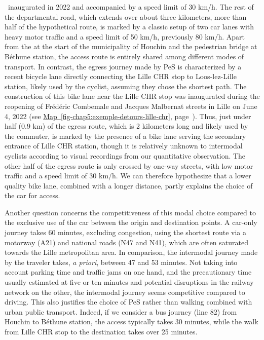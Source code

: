 \begin{refsegment}
{}~inaugurated in 2022 and accompanied by a speed limit of 30 km/h. The rest of the departmental road, which extends over about three kilometers, more than half of the hypothetical route, is marked by a classic setup of two car lanes with heavy motor traffic and a speed limit of 50 km/h, previously 80 km/h. Apart from the  at the start of the municipality of Houchin and the pedestrian bridge at Béthune station, the access route is entirely shared among different modes of transport. In contrast, the egress journey made by \acrshort{PeS} is characterized by a recent bicycle lane directly connecting the Lille CHR stop to Loos-lez-Lille station, likely used by the cyclist, assuming they chose the shortest path. The construction of this bike lane near the Lille CHR stop was inaugurated during the reopening of Frédéric Combemale and Jacques Malbernat streets in Lille on June 4, 2022 (see \hyperref[fig-chap5:exemple-detours-lille-chr]{Map~\ref{fig-chap5:exemple-detours-lille-chr}}, page~\pageref{fig-chap5:exemple-detours-lille-chr}). Thus, just under half (0.9 km) of the egress route, which is 2 kilometers long and likely used by the commuter, is marked by the presence of a bike lane serving the secondary entrance of Lille CHR station, though it is relatively unknown to intermodal cyclists according to visual recordings from our quantitative observation. The other half of the egress route is only crossed by one-way streets, with low motor traffic and a speed limit of 30 km/h. We can therefore hypothesize that a lower quality bike lane, combined with a longer distance, partly explains the choice of the car for access.%

Another question concerns the competitiveness of this modal choice compared to the exclusive use of the car between the origin and destination points. A car-only journey takes 60 minutes, excluding congestion, using the shortest route via a motorway (A21) and national roads (N47 and N41), which are often saturated towards the Lille metropolitan area. In comparison, the intermodal journey made by the traveler takes, \textsl{a priori}, between 47 and 53 minutes. Not taking into account parking time and traffic jams on one hand, and the precautionary time usually estimated at five or ten minutes and potential disruptions in the railway network on the other, the intermodal journey seems competitive compared to driving. This also justifies the choice of \acrshort{PeS} rather than walking combined with urban public transport. Indeed, if we consider a bus journey (line 82) from Houchin to Béthune station, the access typically takes 30 minutes, while the walk from Lille CHR stop to the destination takes over 25 minutes.%


\end{refsegment}
